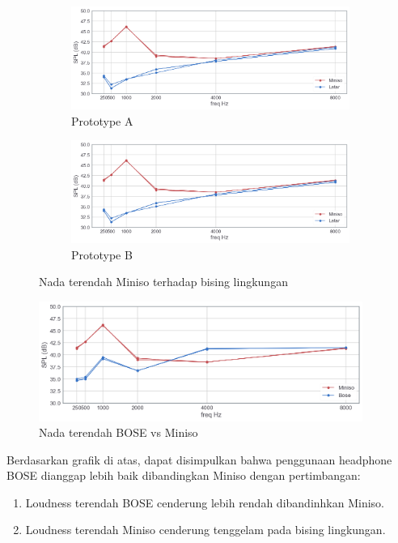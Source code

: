\documentclass[12pt,]{article}
\begin{document}
\begin{itemize}
		\begin{figure}[!ht]
			\centering
			\begin{subfigure}[b]{0.5\textwidth}
				\includegraphics[width=\textwidth]{images/graph/minisolowest_unit1}
				\caption{Prototype A}
			\end{subfigure}
			\begin{subfigure}[b]{0.5\textwidth}
				\includegraphics[width=\textwidth]{images/graph/minisolowest_unit1}
				\caption{Prototype B}
			\end{subfigure}
			\caption{Nada terendah Miniso terhadap bising lingkungan}
		\end{figure}
	
		\begin{figure}[!ht]
			\centering
			\includegraphics[width=300pt]{images/graph/lowestbosevsminiso}
			\caption{Nada terendah BOSE vs Miniso}
		\end{figure}
		
		\newpage
		Berdasarkan grafik di atas, dapat disimpulkan bahwa penggunaan headphone BOSE dianggap lebih baik
		dibandingkan Miniso dengan pertimbangan:
		\begin{enumerate}
			\item Loudness terendah BOSE cenderung lebih rendah dibandinhkan Miniso.
			\item Loudness terendah Miniso cenderung tenggelam pada bising lingkungan.
		\end{enumerate}
		

\end{itemize}
\end{document}
